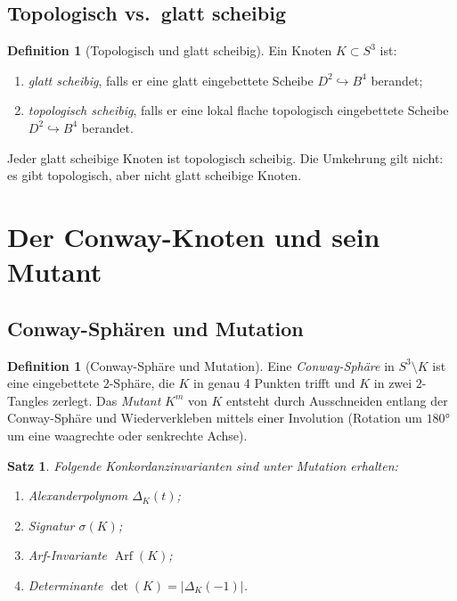 \documentclass[12pt,a4paper]{amsart}
\newtheorem{satz}[theorem]{Satz}
\theoremstyle{definition}
\newtheorem{definition_de}[theorem]{Definition}
\theoremstyle{remark}
\DeclareMathOperator{\Arf}{Arf}
\begin{document}
\subsection{Topologisch vs.\ glatt scheibig}

\begin{definition_de}[Topologisch und glatt scheibig]
Ein Knoten $K \subset S^3$ ist:
\begin{enumerate}[label=\roman*)]
\item \emph{glatt scheibig}, falls er eine glatt eingebettete Scheibe
      $D^2 \hookrightarrow B^4$ berandet;
\item \emph{topologisch scheibig}, falls er eine lokal flache topologisch
      eingebettete Scheibe $D^2 \hookrightarrow B^4$ berandet.
\end{enumerate}
Jeder glatt scheibige Knoten ist topologisch scheibig. Die Umkehrung gilt
nicht: es gibt topologisch, aber nicht glatt scheibige Knoten.
\end{definition_de}

\section{Der Conway-Knoten und sein Mutant}

\subsection{Conway-Sphären und Mutation}

\begin{definition_de}[Conway-Sphäre und Mutation]
Eine \emph{Conway-Sphäre} in $S^3 \setminus K$ ist eine eingebettete
$2$-Sphäre, die $K$ in genau 4 Punkten trifft und $K$ in zwei $2$-Tangles
zerlegt. Das \emph{Mutant} $K^m$ von $K$ entsteht durch Ausschneiden entlang
der Conway-Sphäre und Wiederverkleben mittels einer Involution (Rotation um
$180°$ um eine waagrechte oder senkrechte Achse).
\end{definition_de}

\begin{satz}
Folgende Konkordanzinvarianten sind unter Mutation erhalten:
\begin{enumerate}[label=\roman*)]
\item Alexanderpolynom $\Delta_K(t)$;
\item Signatur $\sigma(K)$;
\item Arf-Invariante $\Arf(K)$;
\item Determinante $\det(K) = |\Delta_K(-1)|$.
\end{enumerate}
\end{satz}
\end{document}
